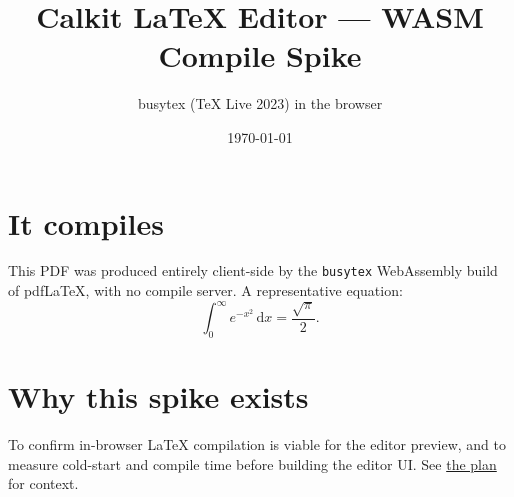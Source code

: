 \documentclass{article}
\title{Calkit LaTeX Editor --- WASM Compile Spike}
\author{busytex (TeX Live 2023) in the browser}
\date{\today}
\begin{document}
\maketitle

\section{It compiles}
This PDF was produced entirely client-side by the \texttt{busytex} WebAssembly
build of pdf\LaTeX{}, with no compile server. A representative equation:
\begin{equation}
  \int_{0}^{\infty} e^{-x^2}\,\mathrm{d}x = \frac{\sqrt{\pi}}{2}.
\end{equation}

\section{Why this spike exists}
To confirm in-browser LaTeX compilation is viable for the editor preview, and to
measure cold-start and compile time before building the editor UI. See
\href{https://example.invalid}{the plan} for context.
\end{document}
